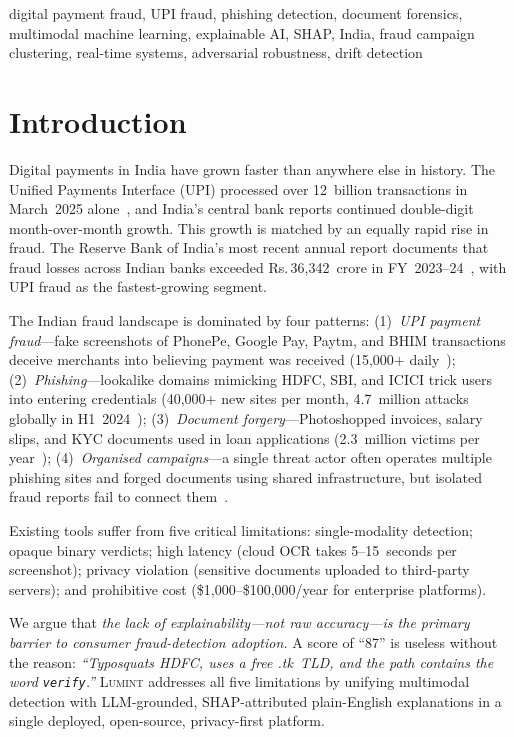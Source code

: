 \documentclass[conference]{IEEEtran}
\def\rupee{\textrm{Rs.\,}}
\begin{document}
\begin{IEEEkeywords}
digital payment fraud, UPI fraud, phishing detection,
document forensics, multimodal machine learning, explainable AI,
SHAP, India, fraud campaign clustering, real-time systems,
adversarial robustness, drift detection
\end{IEEEkeywords}

\section{Introduction}\label{sec:intro}

Digital payments in India have grown faster than anywhere else in
history.
The Unified Payments Interface (UPI) processed over 12~billion
transactions in March~2025 alone~\cite{npci2025}, and India's central
bank reports continued double-digit month-over-month growth.
This growth is matched by an equally rapid rise in fraud.
The Reserve Bank of India's most recent annual report documents that
fraud losses across Indian banks exceeded \rupee{}36{,}342~crore in
FY~2023--24~\cite{rbi2024}, with UPI fraud as the fastest-growing
segment.

The Indian fraud landscape is dominated by four patterns:
(1)~\emph{UPI payment fraud}---fake screenshots of PhonePe, Google Pay,
Paytm, and BHIM transactions deceive merchants into believing payment was
received (15{,}000$+$ daily~\cite{certin2024});
(2)~\emph{Phishing}---lookalike domains mimicking HDFC, SBI, and ICICI
trick users into entering credentials (40{,}000$+$ new sites per month,
4.7~million attacks globally in H1~2024~\cite{apwg2024});
(3)~\emph{Document forgery}---Photoshopped invoices, salary slips, and
KYC documents used in loan applications (2.3~million victims per
year~\cite{rbi2023framework});
(4)~\emph{Organised campaigns}---a single threat actor often operates
multiple phishing sites and forged documents using shared infrastructure,
but isolated fraud reports fail to connect them~\cite{certin2024}.

Existing tools suffer from five critical limitations: single-modality
detection; opaque binary verdicts; high latency (cloud OCR takes
5--15~seconds per screenshot); privacy violation (sensitive documents
uploaded to third-party servers); and prohibitive cost
(\$1{,}000--\$100{,}000/year for enterprise platforms).

We argue that \textit{the lack of explainability---not raw accuracy---is
the primary barrier to consumer fraud-detection adoption.}
A score of ``87'' is useless without the reason: \textit{``Typosquats
HDFC, uses a free .tk~TLD, and the path contains the word
\texttt{verify}.''}
\textsc{Lumint} addresses all five limitations by unifying multimodal
detection with LLM-grounded, SHAP-attributed plain-English explanations
in a single deployed, open-source, privacy-first platform.
\end{document}
